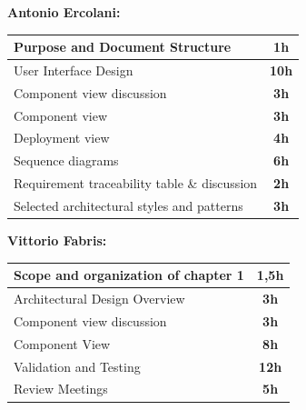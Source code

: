 \documentclass[]{article}
\begin{document}
			\medskip
			\textbf{\large Antonio Ercolani:} \\ \newline
			\begin{tabular}{|l|c|}
				\hline
				\begin{minipage}[t]{10cm}
				Purpose and Document Structure
				\end{minipage} 
				& \textbf{1h} \\ \hline
				\rowcolor[HTML]{DCDCDC} 
				User Interface Design & \textbf{10h} \\ \hline
				Component view discussion & \textbf{3h} \\ \hline
				\rowcolor[HTML]{DCDCDC} 
				Component view & \textbf{3h} \\ \hline
				Deployment view & \textbf{4h} \\ \hline
				\rowcolor[HTML]{DCDCDC} 
				Sequence diagrams & \textbf{6h} \\ \hline
				Requirement traceability table \& discussion & \textbf{2h} \\ \hline
				\rowcolor[HTML]{DCDCDC} 
				Selected architectural styles and patterns  & \textbf{3h} \\ \hline
				
			\end{tabular}
			\newline
			\newline
			
			\medskip
			\textbf{\large Vittorio Fabris:} \\ \newline
			\begin{tabular}{|l|c|}
				\hline
				\begin{minipage}[t]{10cm}
					Scope and organization of chapter 1
				\end{minipage} 
				& \textbf{1,5h} \\ \hline
				\rowcolor[HTML]{DCDCDC} 
				 Architectural Design Overview & \textbf{3h} \\ \hline
				 Component view discussion & \textbf{3h} \\ \hline
				\rowcolor[HTML]{DCDCDC} 
				Component View & \textbf{8h} \\ \hline
				Validation and Testing & \textbf{12h} \\ \hline
				\rowcolor[HTML]{DCDCDC} 
				Review Meetings & \textbf{5h} \\ \hline
			\end{tabular}
		\newline \newline
		
\end{document}
